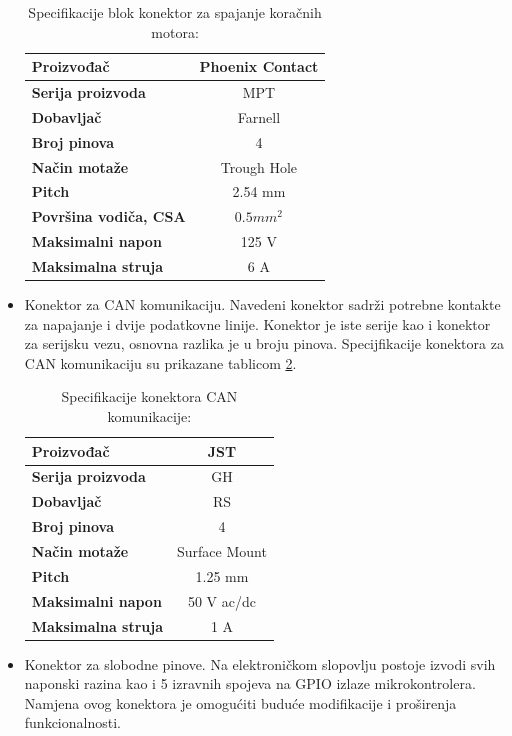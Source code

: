 \documentclass[11pt,a4paper]{article}
\begin{document}
\begin{center}
\begin{itemize}
\begin{table}[H]
	\centering
	\caption{Specifikacije blok konektor za spajanje koračnih motora: }
	\label{tab:specifikacija_connector_terminal}
	\begin{tabular}{|l|c|}
		\hline
		\textbf{Proizvođač} & Phoenix Contact \\ \hline 
		\textbf{Serija proizvoda} & MPT \\ \hline 
		\textbf{Dobavljač} & Farnell \\ \hline 
		\textbf{Broj pinova} & 4 \\ \hline 
		\textbf{Način motaže} & Trough Hole    \\ \hline
		\textbf{Pitch} & 2.54 mm    \\ \hline 
		\textbf{Površina vodiča, CSA} & $0.5 mm^2$     \\ \hline 
		\textbf{Maksimalni napon} & 125 V \\ \hline 
		\textbf{Maksimalna struja} & 6 A \\ \hline
	\end{tabular}
\end{table}
		
		
		\item Konektor za CAN komunikaciju. Navedeni konektor sadrži potrebne kontakte za napajanje i dvije podatkovne linije. Konektor je iste serije kao i konektor za serijsku vezu, osnovna razlika je u broju pinova. Specijfikacije konektora za CAN komunikaciju su prikazane tablicom \ref{tab:specifikacija_connector_CAN}.
		
\begin{table}[H]
	\centering
	\caption{Specifikacije konektora CAN komunikacije: }
	\label{tab:specifikacija_connector_CAN}
	\begin{tabular}{|l|c|}
		\hline
		\textbf{Proizvođač} & JST \\ \hline 
		\textbf{Serija proizvoda} & GH \\ \hline 
		\textbf{Dobavljač} & RS \\ \hline 
		\textbf{Broj pinova} & 4 \\ \hline 
		\textbf{Način motaže} & Surface Mount    \\ \hline
		\textbf{Pitch} & 1.25 mm    \\ \hline 
		\textbf{Maksimalni napon} & 50 V  ac/dc\\ \hline 
		\textbf{Maksimalna struja} & 1 A \\ \hline
	\end{tabular}
\end{table}
		
		
		\item Konektor za slobodne pinove. Na elektroničkom slopovlju postoje izvodi svih naponski razina kao i 5 izravnih spojeva na GPIO izlaze mikrokontrolera. Namjena ovog konektora je omogućiti buduće modifikacije i proširenja funkcionalnosti.	
		
	\end{itemize}
\end{center}
\end{document}

